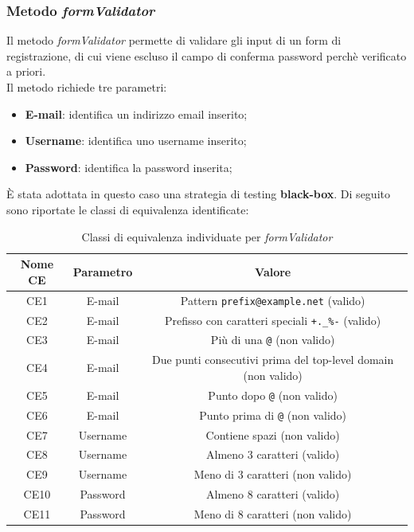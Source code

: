 \documentclass{natourDoc}
\begin{document}
\subsubsection{Metodo \textit{formValidator}}
Il metodo \textit{formValidator} permette di validare gli input di un form di registrazione,
di cui viene escluso il campo di conferma password perchè verificato a priori. \\
Il metodo richiede tre parametri:
\begin{itemize}
	\item \textbf{E-mail}: identifica un indirizzo email inserito;
	\item \textbf{Username}: identifica uno username inserito;
	\item \textbf{Password}: identifica la password inserita;
\end{itemize}

È stata adottata in questo caso una strategia di testing \textbf{black-box}.
Di seguito sono riportate le classi di equivalenza identificate:
\begin{table}[H]
	\centering
	\begin{tabularx}{\textwidth}{ |c|c|c| }
		\hline
		\rowcolor{PineGreen!70}
		\textbf{Nome CE} & \textbf{Parametro} & \textbf{Valore}                                               \\
		\hline
		CE1              & E-mail             & Pattern \texttt{prefix@example.net} (valido)                  \\
		\hline
		CE2              & E-mail             & Prefisso con caratteri speciali \texttt{+.\_\%-} (valido)     \\
		\hline
		CE3              & E-mail             & Più di una \texttt{@} (non valido)                            \\
		\hline
		CE4              & E-mail             & Due punti consecutivi prima del top-level domain (non valido) \\
		\hline
		CE5              & E-mail             & Punto dopo \texttt{@} (non valido)                            \\
		\hline
		CE6              & E-mail             & Punto prima di \texttt{@} (non valido)                        \\
		\hline
		CE7              & Username           & Contiene spazi (non valido)                                   \\
		\hline
		CE8              & Username           & Almeno 3 caratteri (valido)                                   \\
		\hline
		CE9              & Username           & Meno di 3 caratteri (non valido)                              \\
		\hline
		CE10             & Password           & Almeno 8 caratteri (valido)                                   \\
		\hline
		CE11             & Password           & Meno di 8 caratteri (non valido)                              \\
		\hline
	\end{tabularx}
	\caption{Classi di equivalenza individuate per \textit{formValidator}}
\end{table}
\end{document}

